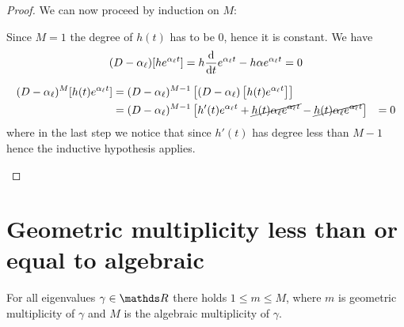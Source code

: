 \documentclass[12pt]{extarticle}
\numberwithin{equation}{section}
\begin{document}
\begin{proof}
    We can now proceed by induction on $M$:
    \begin{description}[font=\normalfont\itshape\space]
        \item[Base case]
              Since $M = 1$ the degree of $h(t)$ has to be $0$, hence it is constant.
              We have
              \begin{equation}
                  (D - \alpha_\ell)[h e^{\alpha_\ell t}] = h \dv{t} e^{\alpha_\ell t} - h\alpha e^{\alpha_\ell t} = 0
              \end{equation}
        \item[Inductive step]
              \begin{align}
                  (D - \alpha_\ell)^M[h(t) e^{\alpha_\ell t}] & = (D - \alpha_\ell)^{M-1}\left[ (D - \alpha_\ell) \left[h(t) e^{\alpha_\ell t}\right]\right]                                                               \\
                                                              & = (D - \alpha_\ell)^{M-1}\left[ h'(t) e^{\alpha_\ell t} + \cancel{h(t)\alpha_\ell e^{\alpha_\ell t}} - \cancel{h(t) \alpha_\ell e^{\alpha_\ell t}} \right]
                                                              & = 0
              \end{align}
              where in the last step we notice that since $h'(t)$ has degree less than $M -1$
              hence the inductive hypothesis applies.
    \end{description}
\end{proof}

\section{Geometric multiplicity less than or equal to algebraic}

\begin{theorem}{}{}
    For all eigenvalues $\gamma \in \R$ there holds $1 \leq m \leq M$,
    where $m$ is geometric multiplicity of $\gamma$ and $M$ is the algebraic multiplicity of $\gamma$.
\end{theorem}
\end{document}
